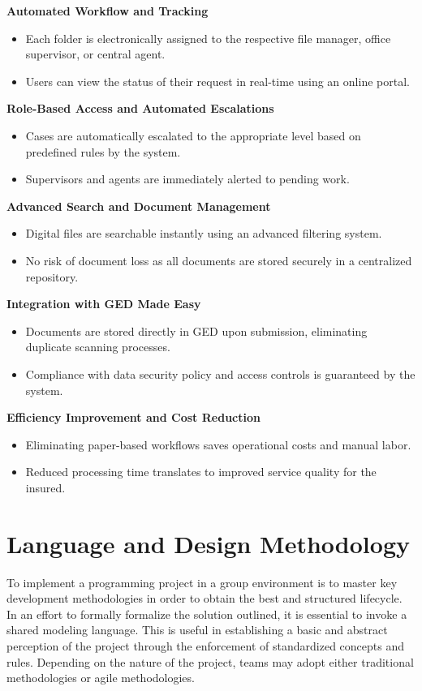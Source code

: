  \textbf{ Automated Workflow and Tracking}
\begin{itemize}
    \item Each folder is electronically assigned to the respective file manager, office supervisor, or central agent.
    \item Users can view the status of their request in real-time using an online portal.
\end{itemize}

\textbf{ Role-Based Access and Automated Escalations}
\begin{itemize}
    \item Cases are automatically escalated to the appropriate level based on predefined rules by the system.
    \item Supervisors and agents are immediately alerted to pending work.
\end{itemize}

 \textbf{ Advanced Search and Document Management}
\begin{itemize}
    \item Digital files are searchable instantly using an advanced filtering system.
    \item No risk of document loss as all documents are stored securely in a centralized repository. 
\end{itemize}

\textbf{ Integration with GED Made Easy}
\begin{itemize}
\item Documents are stored directly in GED upon submission, eliminating duplicate scanning processes.
\item Compliance with data security policy and access controls is guaranteed by the system.
\end{itemize}

 \textbf{ Efficiency Improvement and Cost Reduction}
\begin{itemize}
    \item Eliminating paper-based workflows saves operational costs and manual labor.
    \item Reduced processing time translates to improved service quality for the insured.
\end{itemize}

\section{Language and Design Methodology}

To implement a programming project in a group environment is to master key development methodologies in order to obtain the best and structured lifecycle.
In an effort to formally formalize the solution outlined, it is essential to invoke a shared modeling language. This is useful in establishing a basic and abstract perception of the project through the enforcement of standardized concepts and rules.
Depending on the nature of the project, teams may adopt either traditional methodologies or agile methodologies.

